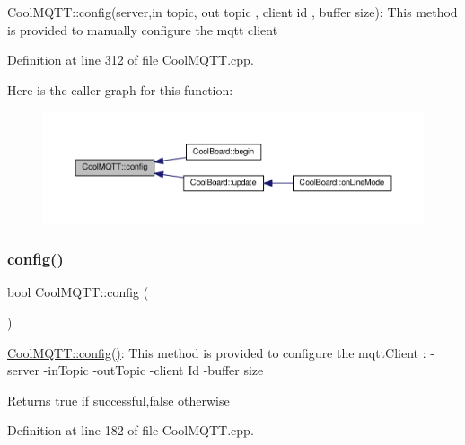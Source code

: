 Cool\+M\+Q\+T\+T\+::config(server,in topic, out topic , client id , buffer size)\+: This method is provided to manually configure the mqtt client 

Definition at line 312 of file Cool\+M\+Q\+T\+T.\+cpp.

Here is the caller graph for this function\+:\nopagebreak
\begin{figure}[H]
\begin{center}
\leavevmode
\includegraphics[width=350pt]{class_cool_m_q_t_t_a0158596b9a2297c8ba609b56ce6bace1_icgraph}
\end{center}
\end{figure}
\mbox{\label{class_cool_m_q_t_t_a6571671781a505feca9a8a56e256c6bc}} 
\subsubsection{\texorpdfstring{config()}{config()}\hspace{0.1cm}{\footnotesize\ttfamily [2/2]}}
{\footnotesize\ttfamily bool Cool\+M\+Q\+T\+T\+::config (\begin{DoxyParamCaption}{ }\end{DoxyParamCaption})}

\hyperlink{class_cool_m_q_t_t_a6571671781a505feca9a8a56e256c6bc}{Cool\+M\+Q\+T\+T\+::config()}\+: This method is provided to configure the mqtt\+Client \+: -\/server -\/in\+Topic -\/out\+Topic -\/client Id -\/buffer size

\begin{DoxyReturn}{Returns}
true if successful,false otherwise 
\end{DoxyReturn}


Definition at line 182 of file Cool\+M\+Q\+T\+T.\+cpp.

\mbox{\label{class_cool_m_q_t_t_a58b0b1f64b269c2681685208262fba1d}} 
